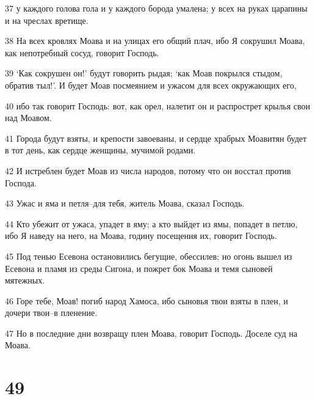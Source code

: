 \par 37 у каждого голова гола и у каждого борода умалена; у всех на руках царапины и на чреслах вретище.
\par 38 На всех кровлях Моава и на улицах его общий плач, ибо Я сокрушил Моава, как непотребный сосуд, говорит Господь.
\par 39 `Как сокрушен он!' будут говорить рыдая; `как Моав покрылся стыдом, обратив тыл!'. И будет Моав посмеянием и ужасом для всех окружающих его,
\par 40 ибо так говорит Господь: вот, как орел, налетит он и распрострет крылья свои над Моавом.
\par 41 Города будут взяты, и крепости завоеваны, и сердце храбрых Моавитян будет в тот день, как сердце женщины, мучимой родами.
\par 42 И истреблен будет Моав из числа народов, потому что он восстал против Господа.
\par 43 Ужас и яма и петля--для тебя, житель Моава, сказал Господь.
\par 44 Кто убежит от ужаса, упадет в яму; а кто выйдет из ямы, попадет в петлю, ибо Я наведу на него, на Моава, годину посещения их, говорит Господь.
\par 45 Под тенью Есевона остановились бегущие, обессилев; но огонь вышел из Есевона и пламя из среды Сигона, и пожрет бок Моава и темя сыновей мятежных.
\par 46 Горе тебе, Моав! погиб народ Хамоса, ибо сыновья твои взяты в плен, и дочери твои--в пленение.
\par 47 Но в последние дни возвращу плен Моава, говорит Господь. Доселе суд на Моава.

\chapter{49}

